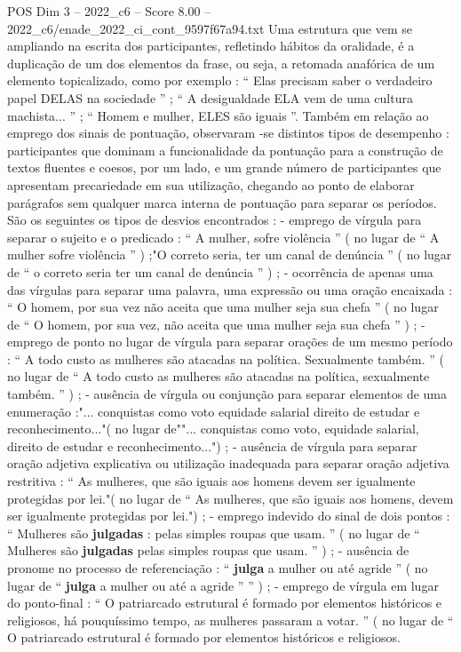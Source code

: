 \begin{textsample}{POS Dim 3 – 2022\_c6 – Score 8.00 – 2022\_c6/enade\_2022\_ci\_cont\_9597f67a94.txt}
Uma estrutura que vem se ampliando na escrita dos participantes, refletindo hábitos da oralidade, é a duplicação de um dos elementos da frase, ou seja, a retomada anafórica de um elemento topicalizado, como por exemplo : “ Elas precisam saber o verdadeiro papel DELAS na sociedade ” ; “ A desigualdade ELA vem de uma cultura machista... ” ; “ Homem e mulher, ELES são iguais ”.
Também em relação ao emprego dos sinais de pontuação, observaram -se distintos tipos de desempenho : participantes que dominam a funcionalidade da pontuação para a construção de textos fluentes e coesos, por um lado, e um grande número de participantes que apresentam precariedade em sua utilização, chegando ao ponto de elaborar parágrafos sem qualquer marca interna de pontuação para separar os períodos.
São os seguintes os tipos de desvios encontrados : - emprego de vírgula para separar o sujeito e o predicado : “ A mulher, sofre violência ” ( no lugar de “ A mulher sofre violência ” ) ;"O correto seria, ter um canal de denúncia ” ( no lugar de “ o correto seria ter um canal de denúncia ” ) ; - ocorrência de apenas uma das vírgulas para separar uma palavra, uma expressão ou uma oração encaixada : “ O homem, por sua vez não aceita que uma mulher seja sua chefa ” ( no lugar de “ O homem, por sua vez, não aceita que uma mulher seja sua chefa ” ) ; - emprego de ponto no lugar de vírgula para separar orações de um mesmo período : “ A todo custo as mulheres são atacadas na política.
Sexualmente também. ” ( no lugar de “ A todo custo as mulheres são atacadas na política, sexualmente também. ” ) ; - ausência de vírgula ou conjunção para separar elementos de uma enumeração :"... conquistas como voto equidade salarial direito de estudar e reconhecimento..."( no lugar de""... conquistas como voto, equidade salarial, direito de estudar e reconhecimento...") ; - ausência de vírgula para separar oração adjetiva explicativa ou utilização inadequada para separar oração adjetiva restritiva : “ As mulheres, que são iguais aos homens devem ser igualmente protegidas por lei."( no lugar de “ As mulheres, que são iguais aos homens, devem ser igualmente protegidas por lei.") ; - emprego indevido do sinal de dois pontos : “ Mulheres são \textbf{julgadas} : pelas simples roupas que usam. ” ( no lugar de “ Mulheres são \textbf{julgadas} pelas simples roupas que usam. ” ) ; - ausência de pronome no processo de referenciação : “ \textbf{julga} a mulher ou até agride ” ( no lugar de “ \textbf{julga} a mulher ou até a agride ” ” ) ; - emprego de vírgula em lugar do ponto-final : “ O patriarcado estrutural é formado por elementos históricos e religiosos, há pouquíssimo tempo, as mulheres passaram a votar. ” ( no lugar de “ O patriarcado estrutural é formado por elementos históricos e religiosos.

\end{textsample}
